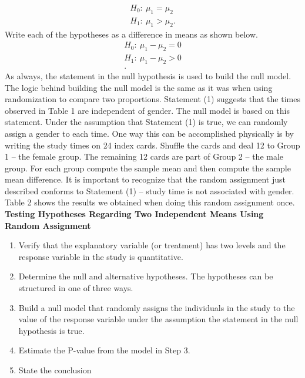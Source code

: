 \documentclass{report}
\begin{document}
    \bigbreak \noindent 
    \begin{align*}
       H_{0}:\ \mu_{1} = \mu_{2} \\
       H_{1}:\ \mu_{1} > \mu_{2}
    .\end{align*}
    \bigbreak \noindent 
    Write each of the hypotheses as a difference in means as shown below. 
    \begin{align*}
        H_{0}:\ \mu_{1} - \mu_{2} = 0 \\
        H_{1}:\ \mu_{1} - \mu_{2} > 0 \\
    .\end{align*}
    \bigbreak \noindent 
    As always, the statement in the null hypothesis is used to build the null model. The logic behind building the null model is the same as it was when using randomization to compare two proportions. Statement (1) suggests that the times observed in Table 1 are independent of gender. The null model is based on this statement. Under the assumption that Statement (1) is true, we can randomly assign a gender to each time. One way this can be accomplished physically is by writing the study times on 24 index cards. Shuffle the cards and deal 12 to Group 1 – the female group. The remaining 12 cards are part of Group 2 – the male group. For each group compute the sample mean and then compute the sample mean difference. It is important to recognize that the random assignment just described conforms to Statement (1) – study time is not associated with gender. Table 2 shows the results we obtained when doing this random assignment once.
    \pagebreak \bigbreak \noindent 
    \textbf{Testing Hypotheses Regarding Two Independent Means Using Random Assignment}
    \bigbreak \noindent 
    \begin{enumerate}
        \item Verify that the explanatory variable (or treatment) has two levels and the response variable in the study is quantitative.
        \item Determine the null and alternative hypotheses. The hypotheses can be structured in one of three ways.
        \item Build a null model that randomly assigns the individuals in the study to the value of the response variable under the assumption the statement in the null hypothesis is true.
        \item Estimate the P-value from the model in Step 3.
        \item State the conclusion
    \end{enumerate}
\end{document}
